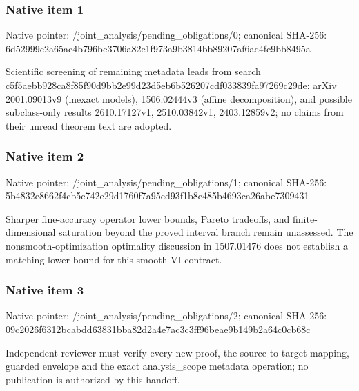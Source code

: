 \documentclass[10pt,a4paper]{article}
\begin{document}
\subsubsection{Native item 1}
Native pointer: /joint\_\allowbreak{}analysis/pending\_\allowbreak{}obligations/0; canonical SHA-256: 6d52999c2a65ac4b796be3706a82e1f973a9b3814bb89207af6ac4fc9bb8495a

\begingroup\raggedright\sloppy Scientific screening of remaining metadata leads from search c5f5aebb928ca8f85f90d9bb2e99d23d5eb6b526207cdf033839fa97269c29de:\allowbreak{} arXiv 2001.09013v9 (inexact models),\allowbreak{} 1506.02444v3 (affine decomposition),\allowbreak{} and possible subclass-only results 2610.17127v1,\allowbreak{} 2510.03842v1,\allowbreak{} 2403.12859v2;\allowbreak{} no claims from their unread theorem text are adopted.\par\endgroup

\subsubsection{Native item 2}
Native pointer: /joint\_\allowbreak{}analysis/pending\_\allowbreak{}obligations/1; canonical SHA-256: 5b4832e8662f4cb5c742e29d1760f7a95cd93f1b8e485b4693ca26abe7309431

\begingroup\raggedright\sloppy Sharper fine-accuracy operator lower bounds,\allowbreak{} Pareto tradeoffs,\allowbreak{} and finite-dimensional saturation beyond the proved interval branch remain unassessed. The nonsmooth-optimization optimality discussion in 1507.01476 does not establish a matching lower bound for this smooth VI contract.\par\endgroup

\subsubsection{Native item 3}
Native pointer: /joint\_\allowbreak{}analysis/pending\_\allowbreak{}obligations/2; canonical SHA-256: 09c2026f6312bcabdd63831bba82d2a4e7ac3c3ff96beae9b149b2a64c0cb68c

\begingroup\raggedright\sloppy Independent reviewer must verify every new proof,\allowbreak{} the source-to-target mapping,\allowbreak{} guarded envelope and the exact analysis\_\allowbreak{}scope metadata operation;\allowbreak{} no publication is authorized by this handoff.\par\endgroup
\end{document}
